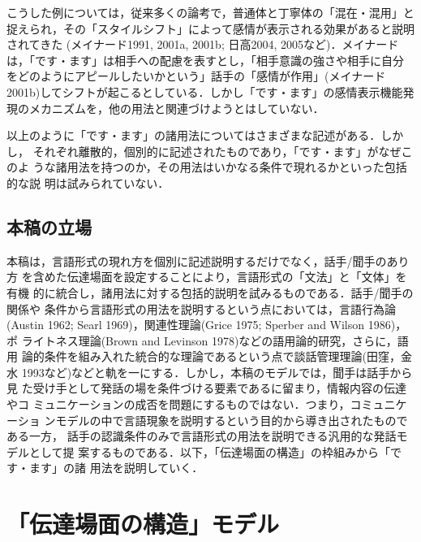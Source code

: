 \documentclass[japanese]{jnlp_1.3c}
\begin{document}

こうした例については，従来多くの論考で，普通体と丁寧体の「混在・混用」と
捉えられ，その「スタイルシフト」によって感情が表示される効果があると説明
されてきた (メイナード1991, 2001a, 2001b; 日高2004, 2005など)．メイナード
は，「です・ます」は相手への配慮を表すとし，「相手意識の強さや相手に自分
をどのようにアピールしたいかという」話手の「感情が作用」(メイナード
2001b)してシフトが起こるとしている．しかし「です・ます」の感情表示機能発
現のメカニズムを，他の用法と関連づけようとはしていない．

以上のように「です・ます」の諸用法についてはさまざまな記述がある．しかし，
それぞれ離散的，個別的に記述されたものであり，「です・ます」がなぜこのよ
うな諸用法を持つのか，その用法はいかなる条件で現れるかといった包括的な説
明は試みられていない．

\subsection{本稿の立場}

本稿は，言語形式の現れ方を個別に記述説明するだけでなく，話手/聞手のあり方
を含めた伝達場面を設定することにより，言語形式の「文法」と「文体」を有機
的に統合し，諸用法に対する包括的説明を試みるものである．話手/聞手の関係や
条件から言語形式の用法を説明するという点においては，言語行為論(Austin
1962; Searl 1969)，関連性理論(Grice 1975; Sperber and Wilson 1986)，ポ
ライトネス理論(Brown and Levinson 1978)などの語用論的研究，さらに，語用
論的条件を組み入れた統合的な理論であるという点で談話管理理論(田窪，金水
1993など)などと軌を一にする．しかし，本稿のモデルでは，聞手は話手から見
た受け手として発話の場を条件づける要素であるに留まり，情報内容の伝達やコ
ミュニケーションの成否を問題にするものではない．つまり，コミュニケーショ
ンモデルの中で言語現象を説明するという目的から導き出されたものである一方，
話手の認識条件のみで言語形式の用法を説明できる汎用的な発話モデルとして提
案するものである．以下，「伝達場面の構造」の枠組みから「です・ます」の諸
用法を説明していく．

\section{「伝達場面の構造」モデル}\label{model}
\end{document}
